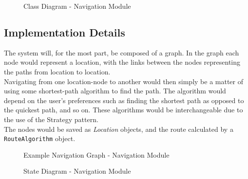 \documentclass[english]{article}
\begin{document}
        \begin{figure}[H]
            \centering	            \centerline{}
            \caption{Class Diagram - Navigation Module}
        \end{figure}
            
        \subsection{Implementation Details}
            The system will, for the most part, be composed of a graph. In the graph each node would represent a location, with the links between the nodes representing the paths from location to location. \\
            Navigating from one location-node to another would then simply be a matter of using some shortest-path algorithm to find the path. The algorithm would depend on the user's preferences such as finding the shortest path as opposed to the quickest path, and so on. These algorithms would be interchangeable due to the use of the Strategy pattern. \\
            The nodes would be saved as \textit{Location} objects, and the route calculated by a \texttt{RouteAlgorithm} object.
        
        \begin{figure}[H]
            \centering	            
            \centerline{}
            \caption{Example Navigation Graph - Navigation Module}
        \end{figure}    
        
        \begin{figure}[H]
            \centering	            
            \centerline{}
            \caption{State Diagram - Navigation Module}
        \end{figure} 
          
\end{document}
